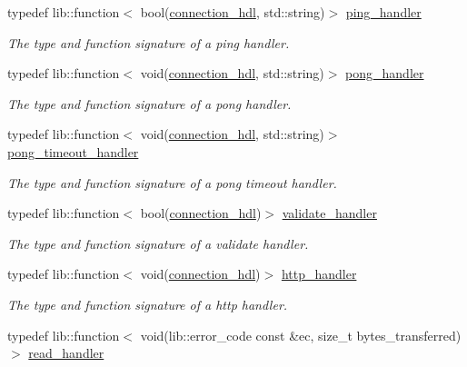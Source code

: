 \begin{DoxyCompactItemize}
typedef lib\+::function$<$ bool(\hyperlink{namespacewebsocketpp_a6b3d26a10ee7229b84b776786332631d}{connection\+\_\+hdl}, std\+::string)$>$ \hyperlink{namespacewebsocketpp_a9dcaaa7370865f1bcacb55ae715793ef}{ping\+\_\+handler}
\begin{DoxyCompactList}\small\item\em The type and function signature of a ping handler. \end{DoxyCompactList}\item 
typedef lib\+::function$<$ void(\hyperlink{namespacewebsocketpp_a6b3d26a10ee7229b84b776786332631d}{connection\+\_\+hdl}, std\+::string)$>$ \hyperlink{namespacewebsocketpp_a1798d54e6d98a481cf870091af84bc1f}{pong\+\_\+handler}
\begin{DoxyCompactList}\small\item\em The type and function signature of a pong handler. \end{DoxyCompactList}\item 
typedef lib\+::function$<$ void(\hyperlink{namespacewebsocketpp_a6b3d26a10ee7229b84b776786332631d}{connection\+\_\+hdl}, std\+::string)$>$ \hyperlink{namespacewebsocketpp_a2c5925a111b9e553efebea35d5ea155f}{pong\+\_\+timeout\+\_\+handler}
\begin{DoxyCompactList}\small\item\em The type and function signature of a pong timeout handler. \end{DoxyCompactList}\item 
typedef lib\+::function$<$ bool(\hyperlink{namespacewebsocketpp_a6b3d26a10ee7229b84b776786332631d}{connection\+\_\+hdl})$>$ \hyperlink{namespacewebsocketpp_ae28f3fed86a59b1998746694f3d4edbd}{validate\+\_\+handler}
\begin{DoxyCompactList}\small\item\em The type and function signature of a validate handler. \end{DoxyCompactList}\item 
typedef lib\+::function$<$ void(\hyperlink{namespacewebsocketpp_a6b3d26a10ee7229b84b776786332631d}{connection\+\_\+hdl})$>$ \hyperlink{namespacewebsocketpp_a37bc4d5b3b21d3bb494d8a23236315d2}{http\+\_\+handler}
\begin{DoxyCompactList}\small\item\em The type and function signature of a http handler. \end{DoxyCompactList}\item 
typedef lib\+::function$<$ void(lib\+::error\+\_\+code const \&ec, size\+\_\+t bytes\+\_\+transferred)$>$ \hyperlink{namespacewebsocketpp_a6fb3f66d640c365795dcc01a7f87c900}{read\+\_\+handler}

\end{DoxyCompactItemize}

